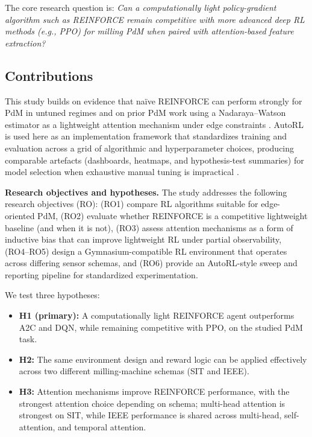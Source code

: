\documentclass[sn-basic]{sn-jnl} %
\begin{document}
The core research question is: \emph{Can a computationally light policy-gradient algorithm such as \textsc{REINFORCE} remain competitive with more advanced deep RL methods (e.g., \textsc{PPO}) for milling PdM when paired with attention-based feature extraction?}

\subsection{Contributions}
This study builds on evidence that na\"{i}ve \textsc{REINFORCE} can perform strongly for PdM in untuned regimes \cite{Siraskar2025} and on prior PdM work using a Nadaraya--Watson estimator as a lightweight attention mechanism under edge constraints \cite{Siraskar2024}. AutoRL is used here as an implementation framework that standardizes training and evaluation across a grid of algorithmic and hyperparameter choices, producing comparable artefacts (dashboards, heatmaps, and hypothesis-test summaries) for model selection when exhaustive manual tuning is impractical \cite{Schwartz2020, Strubell2019, Faust2019, Mussi2022}.

\textbf{Research objectives and hypotheses.}
The study addresses the following research objectives (RO): (RO1) compare RL algorithms suitable for edge-oriented PdM, (RO2) evaluate whether \textsc{REINFORCE} is a competitive lightweight baseline (and when it is not), (RO3) assess attention mechanisms as a form of inductive bias that can improve lightweight RL under partial observability, (RO4--RO5) design a Gymnasium-compatible RL environment that operates across differing sensor schemas, and (RO6) provide an AutoRL-style sweep and reporting pipeline for standardized experimentation.

We test three hypotheses:
\begin{itemize}
        \item \textbf{H1 (primary):} A computationally light \textsc{REINFORCE} agent outperforms \textsc{A2C} and \textsc{DQN}, while remaining competitive with \textsc{PPO}, on the studied PdM task.
        \item \textbf{H2:} The same environment design and reward logic can be applied effectively across two different milling-machine schemas (SIT and IEEE).
        \item \textbf{H3:} Attention mechanisms improve \textsc{REINFORCE} performance, with the strongest attention choice depending on schema; multi-head attention is strongest on SIT, while IEEE performance is shared across multi-head, self-attention, and temporal attention.
\end{itemize}
\end{document}
